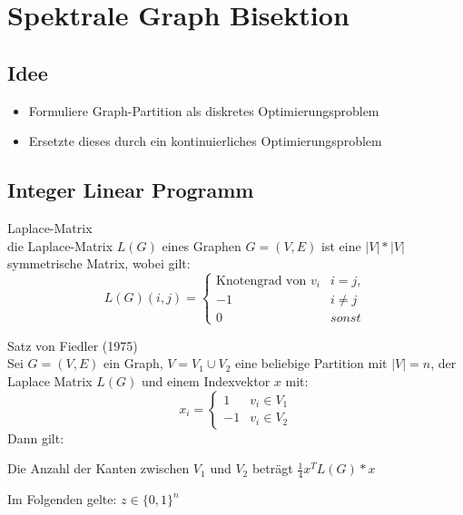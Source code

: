 \section{Spektrale Graph Bisektion}
\subsection{Idee}
\begin{itemize}
	\item Formuliere Graph-Partition als diskretes Optimierungsproblem
	\item Ersetzte dieses durch ein kontinuierliches Optimierungsproblem
\end{itemize}

\subsection{Integer Linear Programm}
\begin{mydef}
	Laplace-Matrix \\
	die Laplace-Matrix $L(G)$ eines Graphen $G=(V,E)$ ist eine $|V|*|V|$ symmetrische Matrix, wobei gilt:
	$$
	L(G)(i,j)=
	\begin{cases}
	\text{Knotengrad von } v_i & i=j,\\
	-1 & i\not=j \\
	0 & sonst
	\end{cases}
	$$
\end{mydef}

\begin{mysatz*}
	Satz von Fiedler (1975) \\
	Sei $G=(V,E)$ ein Graph, $V=V_1 \cup V_2$ eine beliebige Partition mit $|V| = n$, der Laplace Matrix $L(G)$ und einem Indexvektor $x$ mit:
		$$
		x_i=
		\begin{cases}
		1 & v_i \in V_1\\
		-1 & v_i \in V_2 
		\end{cases}
		$$
	Dann gilt:
	\begin{center}
		Die Anzahl der Kanten zwischen $V_1$ und $V_2$ beträgt $\frac{1}{4}x^TL(G)*x$
	\end{center}
\end{mysatz*}

Im Folgenden gelte: $z \in \{0,1\}^n$

